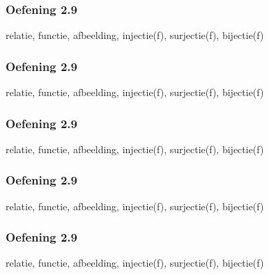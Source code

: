 \documentclass[dutch]{../khlslides}
\newcommand{\axes}{
  \path[use as bounding box] (-.5,-.5) rectangle (4,4);
  \draw[step=3cm,gray,thin] (-.5,-.5) grid (4,4);
  \draw[thin,->] (-.5,0) -- (4,0) node[at end,above left] {$A$};
  \draw[thin,->] (0,-.5) -- (0,4) node[at end,left] {$B$};
}
\begin{document}
\begin{frame}
  \frametitle{Oefening 2.9}
  \begin{center}
    relatie, functie, afbeelding, injectie(f), surjectie(f), bijectie(f)
    \vskip1cm
  \end{center}
\end{frame}

\begin{frame}
  \frametitle{Oefening 2.9}
  \begin{center}
    relatie, functie, afbeelding, injectie(f), surjectie(f), bijectie(f)
    \vskip1cm
  \end{center}
\end{frame}

\begin{frame}
  \frametitle{Oefening 2.9}
  \begin{center}
    relatie, functie, afbeelding, injectie(f), surjectie(f), bijectie(f)
    \vskip1cm
  \end{center}
\end{frame}

\begin{frame}
  \frametitle{Oefening 2.9}
  \begin{center}
    relatie, functie, afbeelding, injectie(f), surjectie(f), bijectie(f)
    \vskip1cm
  \end{center}
\end{frame}

\begin{frame}
  \frametitle{Oefening 2.9}
  \begin{center}
    relatie, functie, afbeelding, injectie(f), surjectie(f), bijectie(f)
    \vskip1cm
  \end{center}
\end{frame}
\end{document}
